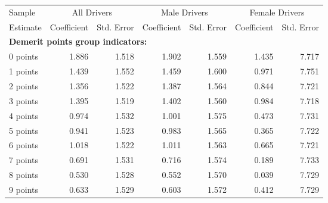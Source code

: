 
\begin{table}%
\centering 
\begin{tabular}{l r r r r r r} 

\hline 
 

Sample 
 & \multicolumn{2}{c}{All  Drivers}  & \multicolumn{2}{c}{Male  Drivers}  & \multicolumn{2}{c}{Female  Drivers}   \\ 
 

 \cmidrule(lr){1-1}\cmidrule(lr){2-3}\cmidrule(lr){4-5}\cmidrule(lr){6-7} 

Estimate  & Coefficient & Std. Error  & Coefficient & Std. Error  & Coefficient & Std. Error   \\ 
 

\hline 
 
\multicolumn{4}{l}{\textbf{Demerit points group indicators:}}  \\ 
 
0 points  &  1.886  &  1.518  &  1.902  &  1.559  &  1.435  &  7.717   \\ 
 
1 points  &  1.439  &  1.552  &  1.459  &  1.600  &  0.971  &  7.751   \\ 
 
2 points  &  1.356  &  1.522  &  1.387  &  1.564  &  0.844  &  7.721   \\ 
 
3 points  &  1.395  &  1.519  &  1.402  &  1.560  &  0.984  &  7.718   \\ 
 
4 points  &  0.974  &  1.532  &  1.001  &  1.575  &  0.473  &  7.731   \\ 
 
5 points  &  0.941  &  1.523  &  0.983  &  1.565  &  0.365  &  7.722   \\ 
 
6 points  &  1.018  &  1.522  &  1.011  &  1.563  &  0.665  &  7.721   \\ 
 
7 points  &  0.691  &  1.531  &  0.716  &  1.574  &  0.189  &  7.733   \\ 
 
8 points  &  0.530  &  1.528  &  0.552  &  1.570  &  0.039  &  7.729   \\ 
 
9 points  &  0.633  &  1.529  &  0.603  &  1.572  &  0.412  &  7.729   \\ 
 

\end{tabular}
\end{table}
